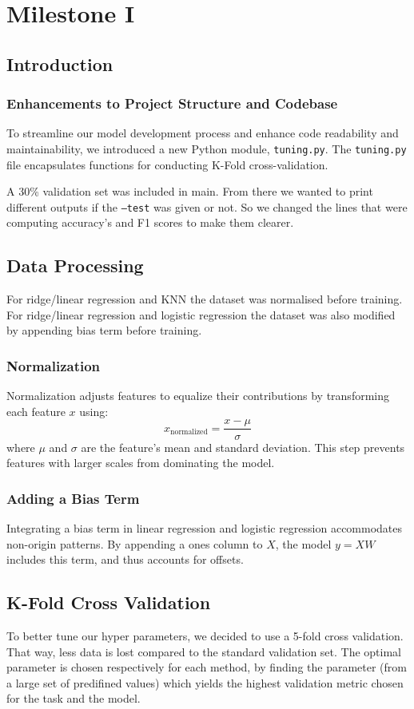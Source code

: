 \section{Milestone I}
\subsection{Introduction}

\subsubsection{Enhancements to Project Structure and Codebase}
To streamline our model development process and enhance code readability and maintainability, we introduced a new Python module, \texttt{tuning.py}.
The \texttt{tuning.py} file encapsulates functions for conducting K-Fold cross-validation.

A 30\% validation set was included in main. From there we wanted to print different outputs if the \texttt{--test} was given or not. So we changed the lines that were computing accuracy's and F1 scores to make them clearer.

\subsection{Data Processing}
For ridge/linear regression and KNN the dataset was normalised before training. For ridge/linear regression and logistic regression the dataset was also modified by appending bias term before training.

\subsubsection{Normalization}
Normalization adjusts features to equalize their contributions by transforming each feature \(x\) using: \[ x_{\text{normalized}} = \frac{x - \mu}{\sigma} \] where \(\mu\) and \(\sigma\) are the feature's mean and standard deviation. This step prevents features with larger scales from dominating the model.

\subsubsection{Adding a Bias Term}
Integrating a bias term in linear regression and logistic regression accommodates non-origin patterns. By appending a ones column to \(X\), the model \(y = XW\) includes this term, and thus accounts for offsets.

\subsection{K-Fold Cross Validation}
To better tune our hyper parameters, we decided to use a 5-fold cross validation. That way, less data is lost compared to the standard validation set. The optimal parameter is chosen respectively for each method, by finding the parameter (from a large set of predifined values) which yields the highest validation metric chosen for the task and the model.


